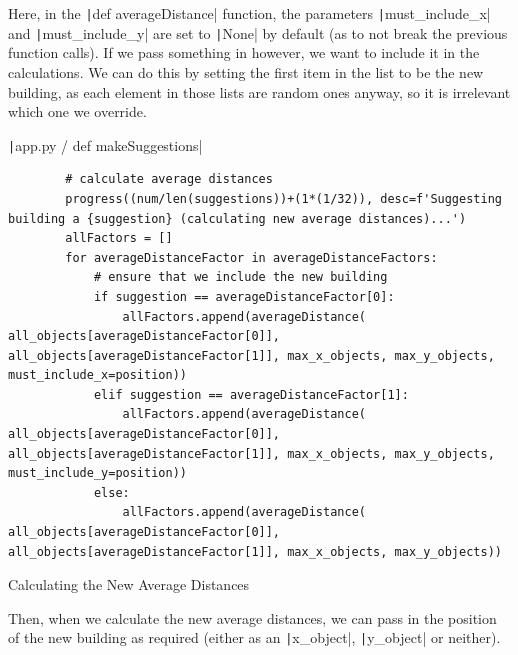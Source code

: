 \documentclass[12pt]{report}
\newcommand{\pil}[1]{\protect\texttt|#1|}
\begin{document}
Here, in the \pil{def averageDistance} function, the parameters \pil{must_include_x} and \pil{must_include_y} are set to \pil{None} by default (as to not break the previous function calls). If we pass something in however, we want to include it in the calculations. We can do this by setting the first item in the list to be the new building, as each element in those lists are random ones anyway, so it is irrelevant which one we override.

\begin{listing}[H]
\pil{app.py / def makeSuggestions}
\begin{verbatim}
        # calculate average distances
        progress((num/len(suggestions))+(1*(1/32)), desc=f'Suggesting building a {suggestion} (calculating new average distances)...')
        allFactors = []
        for averageDistanceFactor in averageDistanceFactors:
            # ensure that we include the new building
            if suggestion == averageDistanceFactor[0]:
                allFactors.append(averageDistance( all_objects[averageDistanceFactor[0]], all_objects[averageDistanceFactor[1]], max_x_objects, max_y_objects, must_include_x=position))
            elif suggestion == averageDistanceFactor[1]:
                allFactors.append(averageDistance( all_objects[averageDistanceFactor[0]], all_objects[averageDistanceFactor[1]], max_x_objects, max_y_objects, must_include_y=position))
            else:
                allFactors.append(averageDistance( all_objects[averageDistanceFactor[0]], all_objects[averageDistanceFactor[1]], max_x_objects, max_y_objects))
\end{verbatim}
\caption{Calculating the New Average Distances}\label{cs:newAverageDistances}
\end{listing}

Then, when we calculate the new average distances, we can pass in the position of the new building as required (either as an \pil{x_object}, \pil{y_object} or neither).

\begin{center}
\end{center}
\end{document}
